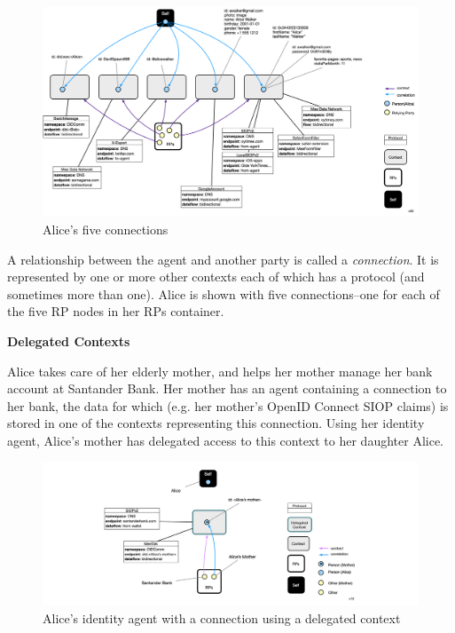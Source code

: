 \documentclass[11pt, oneside]{article}   	%
\begin{document}
\begin{figure}[htbp]
\includegraphics[width=\textwidth]{./images/multiple-connections.png}
\caption{Alice's five connections}
\label{fig:groups}
\end{figure}

A relationship between the agent and another party is called a \emph{connection}. It is represented by one or more other contexts each of which has a protocol (and sometimes more than one). Alice is shown with five connections--one for each of the five RP nodes in her RPs container. 

\textbf{Delegated Contexts}

Alice takes care of her elderly mother, and helps her mother manage her bank account at Santander Bank. Her mother has an agent containing a connection to her bank, the data for which (e.g. her mother's OpenID Connect SIOP claims) is stored in one of the contexts representing this connection. Using her identity agent, Alice's mother has delegated access to this context to her daughter Alice.

\begin{figure}[htbp]
\includegraphics[width=\textwidth]{./images/delegated-contexts.png}
\caption{Alice's identity agent with a connection using a delegated context}
\label{fig:delegated-contexts}
\end{figure}
\end{document}
